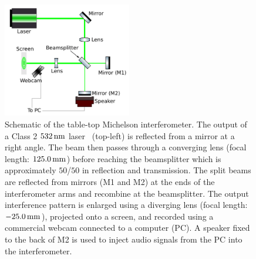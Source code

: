 \documentclass[paper-main.tex]{subfiles}
\begin{document}
\begin{figure}
	\includegraphics[width=0.5\textwidth]{figures/ifo_schematic_webcam_edit.pdf}
	\caption{\label{fig:ifo_schematic_webcam}
Schematic of the table-top Michelson interferometer. 
The output of a Class 2 $532\,{\rm nm}$ laser~\cite{ThorLabsIFO} (top-left) is reflected from a mirror at a right angle. The beam then passes through a converging lens (focal length: $125.0\,{\rm mm}$) before reaching the beamsplitter which is approximately $50$/$50$ in reflection and transmission. 
The split beams are reflected from mirrors (M1 and M2) at the ends of the interferometer arms and recombine at the beamsplitter. 
The output interference pattern is enlarged using a diverging lens (focal length: $-25.0\,{\rm mm}$), projected onto a screen, and recorded using a commercial webcam connected to a computer (PC). 
A speaker fixed to the back of M2 is used to inject audio signals from the PC into the interferometer.
    }
\end{figure}
\end{document}
